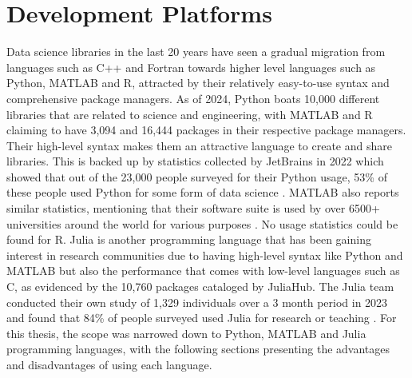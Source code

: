 \section{Development Platforms}
Data science libraries in the last 20 years have seen a gradual migration from languages such as C++ and Fortran towards
higher level languages such as Python, MATLAB and R, attracted by their relatively easy-to-use syntax and comprehensive
package managers. As of 2024, Python boats 10,000 different libraries that are related to science and engineering, with
MATLAB and R claiming to have 3,094 and 16,444 packages in their respective package managers. Their high-level syntax
makes them an attractive language to create and share libraries. This is backed up by statistics collected by JetBrains
in 2022 which showed that out of the 23,000 people surveyed for their Python usage, 53\% of these people used Python for
some form of data science \cite{PythonDevelopersSurvey}. MATLAB also reports similar statistics, mentioning that their
software suite is used by over 6500+ universities around the world for various purposes \cite{MATLABAcademia}. No usage
statistics could be found for R. Julia is another programming language that has been gaining interest in research
communities due to having high-level syntax like Python and MATLAB but also the performance that comes with low-level
languages such as C, as evidenced by the 10,760 packages cataloged by JuliaHub. The Julia team conducted their own study
of 1,329 individuals over a 3 month period in 2023 and found that 84\% of people surveyed used Julia for research or
teaching \cite{clasterJuliaUserDeveloper}. For this thesis, the scope was narrowed down to Python, MATLAB and Julia
programming languages, with the following sections presenting the advantages and disadvantages of using each language.

